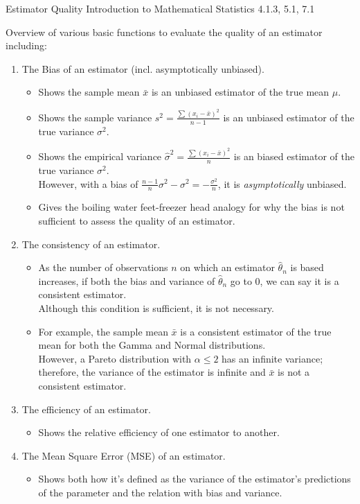 \begin{CHPT_SUMM_AUTO_NUMB}[label = {L.-25}]{Estimator Quality}
Introduction to Mathematical Statistics 4.1.3, 5.1, 7.1

\tcbline

Overview of various basic functions to evaluate the quality of an estimator including:
\begin{enumerate}[leftmargin = *]
	\item	The Bias of an estimator (incl. asymptotically unbiased).
		\begin{itemize}[leftmargin = *]
		\item	Shows the sample mean $\bar{x}$ is an unbiased estimator of the true mean $\mu$.
		\item	Shows the sample variance $s^{2} = \frac{\sum (x_{i} - \bar{x})^{2}}{n - 1}$ is an unbiased estimator of the true variance $\sigma^{2}$.
		\item	Shows the empirical variance $\hat{\sigma}^{2} = \frac{\sum (x_{i} - \bar{x})^{2}}{n}$ is an biased estimator of the true variance $\sigma^{2}$.	\\
				However, with a bias of $\frac{n - 1}{n}\sigma^{2} - \sigma^{2} = -\frac{\sigma^{2}}{n}$, it is \textit{asymptotically} unbiased.
		\item	Gives the boiling water feet-freezer head analogy for why the bias is not sufficient to assess the quality of an estimator.
		\end{itemize}
	\item	The consistency of an estimator.
		\begin{itemize}[leftmargin = *]
		\item	As the number of observations $n$ on which an estimator $\hat{\theta}_{n}$ is based increases, if both the bias and variance of $\hat{\theta}_{n}$ go to 0, we can say it is a consistent estimator.	\\
				Although this condition is sufficient, it is not necessary.
		\item	For example, the sample mean $\bar{x}$ is a consistent estimator of the true mean for both the Gamma and Normal distributions.	\\
				However, a Pareto distribution with $\alpha \leq 2$ has an infinite variance; therefore, the variance of the estimator is infinite and $\bar{x}$ is not a consistent estimator.
		\end{itemize}
	\item	The efficiency of an estimator.
		\begin{itemize}[leftmargin = *]
		\item	Shows the relative efficiency of one estimator to another.
		\end{itemize}
	\item	The Mean Square Error (MSE) of an estimator.
		\begin{itemize}[leftmargin = *]
		\item	Shows both how it's defined as the variance of the estimator's predictions of the parameter and the relation with bias and variance.
		\end{itemize}
\end{enumerate}


\end{CHPT_SUMM_AUTO_NUMB}
